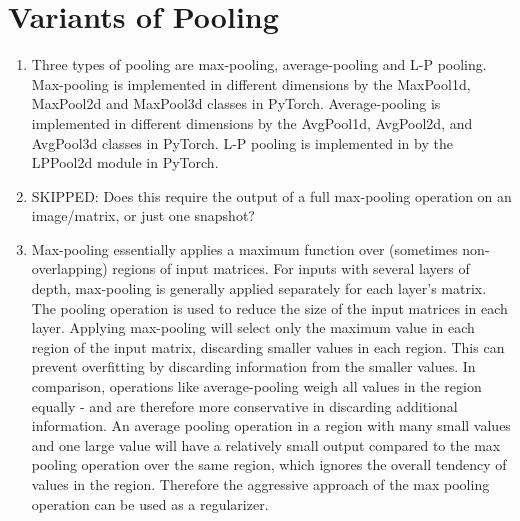 \documentclass[a4paper]{article}
\begin{document}
\section{Variants of Pooling}
\begin{enumerate}
\item{Three types of pooling are max-pooling, average-pooling and L-P pooling. Max-pooling is implemented in different dimensions by the MaxPool1d, MaxPool2d and MaxPool3d classes in PyTorch. Average-pooling is implemented in different dimensions by the AvgPool1d, AvgPool2d, and AvgPool3d classes in PyTorch. L-P pooling is implemented in by the LPPool2d module in PyTorch. }
\item{ SKIPPED: Does this require the output of a full max-pooling operation on an image/matrix, or just one snapshot? }
\item{ Max-pooling essentially applies a maximum function over (sometimes non-overlapping) regions of input matrices. For inputs with several layers of depth, max-pooling is generally applied separately for each layer's matrix. The pooling operation is used to reduce the size of the input matrices in each layer. Applying max-pooling will select only the maximum value in each region of the input matrix, discarding smaller values in each region. This can prevent overfitting by discarding information from the smaller values. In comparison, operations like average-pooling weigh all values in the region equally - and are therefore more conservative in discarding additional information. An average pooling operation in a region with many small values and one large value will have a relatively small output compared to the max pooling operation over the same region, which ignores the overall tendency of values in the region. Therefore the aggressive approach of the max pooling operation can be used as a regularizer. 
}
\end{enumerate}
\end{document}
